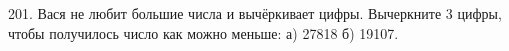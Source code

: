 201. Вася не любит большие числа и вычёркивает цифры. Вычеркните 3 цифры, чтобы получилось число как можно меньше: а) 27818 б) 19107.\\
